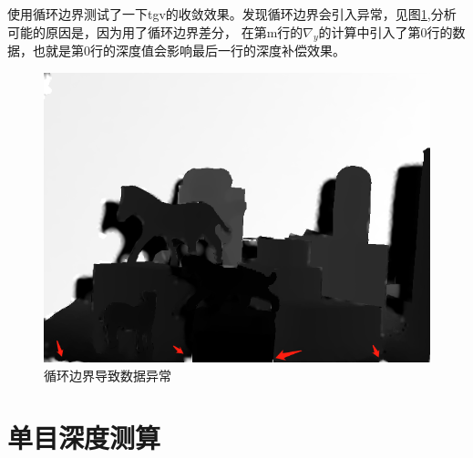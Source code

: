 \documentclass[UTF8]{ctexart}
\begin{document}
\begin{sloppypar}
        使用循环边界测试了一下tgv的收敛效果。发现循环边界会引入异常，见图\ref{fig:badEdgeLoopD},分析可能的原因是，因为用了循环边界差分，
        在第m行的$\nabla_y$的计算中引入了第0行的数据，也就是第0行的深度值会影响最后一行的深度补偿效果。
        \begin{figure}[htbp]
            \includegraphics[width=0.9\linewidth]{figure/badEdgeD}
            \caption{\small 循环边界导致数据异常}
            \label{fig:badEdgeLoopD}
        \end{figure}
        \section{单目深度测算}

\end{sloppypar}
\end{document}
